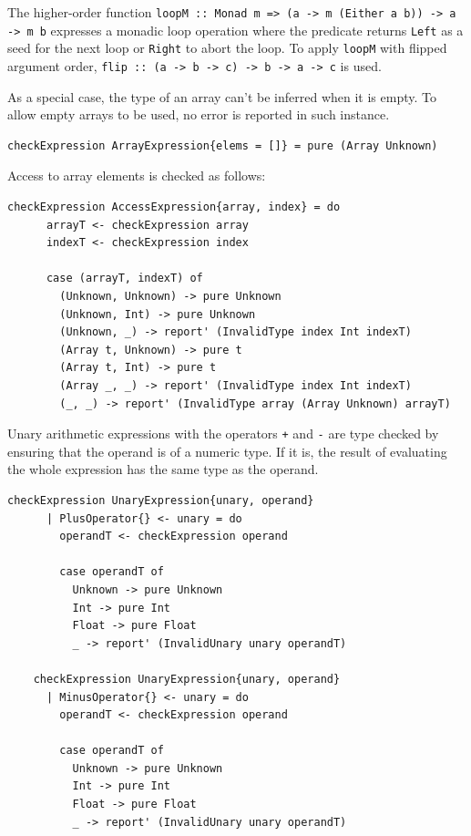 \documentclass[UdineBachThesis,american,11pt]{PhdThesis}
\begin{document}
  The higher-order function
  \mbox{\texttt{loopM :: Monad m => (a -> m (Either a b)) -> a -> m b}}
  expresses a monadic loop operation where the predicate returns
  \mbox{\texttt{Left}} as a seed for the next loop or \mbox{\texttt{Right}} to
  abort the loop. To apply \mbox{\texttt{loopM}} with flipped argument order,
  \mbox{\texttt{flip :: (a -> b -> c) -> b -> a -> c}} is used.

  As a special case, the type of an array can't be inferred when it is empty. To
  allow empty arrays to be used, no error is reported in such instance.

  \begin{Verbatim}[gobble=4,fontsize=\small]
    checkExpression ArrayExpression{elems = []} = pure (Array Unknown)
  \end{Verbatim}

  Access to array elements is checked as follows:

  \begin{Verbatim}[gobble=4,fontsize=\small]
    checkExpression AccessExpression{array, index} = do
      arrayT <- checkExpression array
      indexT <- checkExpression index

      case (arrayT, indexT) of
        (Unknown, Unknown) -> pure Unknown
        (Unknown, Int) -> pure Unknown
        (Unknown, _) -> report' (InvalidType index Int indexT)
        (Array t, Unknown) -> pure t
        (Array t, Int) -> pure t
        (Array _, _) -> report' (InvalidType index Int indexT)
        (_, _) -> report' (InvalidType array (Array Unknown) arrayT)
  \end{Verbatim}

  Unary arithmetic expressions with the operators \texttt{+} and \texttt{-} are
  type checked by ensuring that the operand is of a numeric type. If it is, the
  result of evaluating the whole expression has the same type as the operand.

  \begin{Verbatim}[gobble=4,fontsize=\small]
    checkExpression UnaryExpression{unary, operand}
      | PlusOperator{} <- unary = do
        operandT <- checkExpression operand

        case operandT of
          Unknown -> pure Unknown
          Int -> pure Int
          Float -> pure Float
          _ -> report' (InvalidUnary unary operandT)

    checkExpression UnaryExpression{unary, operand}
      | MinusOperator{} <- unary = do
        operandT <- checkExpression operand

        case operandT of
          Unknown -> pure Unknown
          Int -> pure Int
          Float -> pure Float
          _ -> report' (InvalidUnary unary operandT)
  \end{Verbatim}
\end{document}
